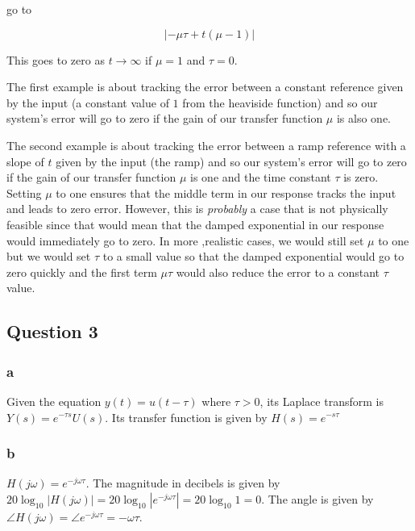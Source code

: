 \documentclass[11pt]{article}
\begin{document}
go to

\[ | -\mu \tau + t (\mu - 1) | \]

This goes to zero as $t \to \infty$ if $\mu = 1$ and $\tau = 0$.

The first example is about tracking the error between a constant reference given by the input (a constant value of $1$ from the heaviside function) and so our system's error will go to zero if the gain of our transfer function $\mu$ is also one.

The second example is about tracking the error between a ramp reference with a slope of $t$ given by the input (the ramp) and so our system's error will go to zero if the gain of our transfer function $\mu$ is one and the time constant $\tau$ is zero. Setting $\mu$ to one ensures that the middle term in our response tracks the input and leads to zero error. However, this is \textit{probably} a case that is not physically feasible since that would mean that the damped exponential in our response would immediately go to zero. In more ,realistic cases, we would still set $\mu$ to one but we would set $\tau$ to a small value so that the damped exponential would go to zero quickly and the first term $\mu \tau$ would also reduce the error to a constant $\tau$ value.

\subsection{Question 3}

\subsubsection{a}

Given the equation $y(t) = u(t - \tau)$ where $\tau > 0$, its Laplace transform is $Y(s) = e^{-\tau s} U(s)$. Its transfer function is given by $H(s) = e^{-s \tau}$

\subsubsection{b}

$H(j\omega) = e^{-j \omega \tau}$. The magnitude in decibels is given by $20 \log_{10} |H(j\omega)| = 20 \log_{10} |e^{-j \omega \tau}| = 20 \log_{10} 1 = 0$. The angle is given by $\angle H(j\omega) = \angle e^{-j \omega \tau} = -\omega \tau$.
\end{document}

